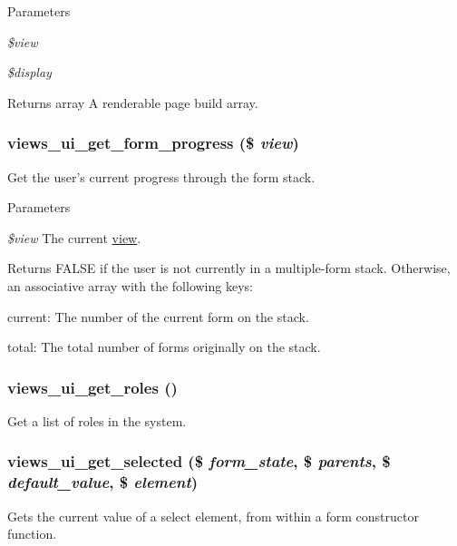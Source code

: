 \begin{DoxyParams}{Parameters}
\item[{\em \$view}]\item[{\em \$display}]\end{DoxyParams}
\begin{DoxyReturn}{Returns}
array A renderable page build array. 
\end{DoxyReturn}
\hypertarget{admin_8inc_a2be3967d1a19ae016b180cbdb084c107}{
\subsubsection[{views\_\-ui\_\-get\_\-form\_\-progress}]{\setlength{\rightskip}{0pt plus 5cm}views\_\-ui\_\-get\_\-form\_\-progress (\$ {\em view})}}
\label{admin_8inc_a2be3967d1a19ae016b180cbdb084c107}
Get the user's current progress through the form stack.


\begin{DoxyParams}{Parameters}
\item[{\em \$view}]The current \hyperlink{classview}{view}.\end{DoxyParams}
\begin{DoxyReturn}{Returns}
FALSE if the user is not currently in a multiple-\/form stack. Otherwise, an associative array with the following keys:
\begin{DoxyItemize}
\item current: The number of the current form on the stack.
\item total: The total number of forms originally on the stack. 
\end{DoxyItemize}
\end{DoxyReturn}
\hypertarget{admin_8inc_a6c6227b21a8ca8e33eabfe00598410cd}{
\subsubsection[{views\_\-ui\_\-get\_\-roles}]{\setlength{\rightskip}{0pt plus 5cm}views\_\-ui\_\-get\_\-roles ()}}
\label{admin_8inc_a6c6227b21a8ca8e33eabfe00598410cd}
Get a list of roles in the system. \hypertarget{admin_8inc_abb2d96e81ac96a731965b5fddd4838d2}{
\subsubsection[{views\_\-ui\_\-get\_\-selected}]{\setlength{\rightskip}{0pt plus 5cm}views\_\-ui\_\-get\_\-selected (\$ {\em form\_\-state}, \/  \$ {\em parents}, \/  \$ {\em default\_\-value}, \/  \$ {\em element})}}
\label{admin_8inc_abb2d96e81ac96a731965b5fddd4838d2}
Gets the current value of a select element, from within a form constructor function.

